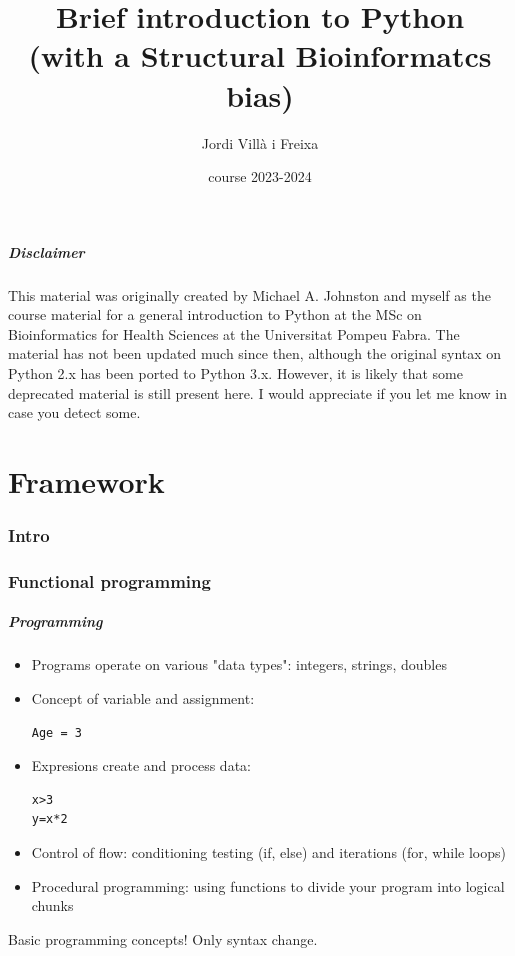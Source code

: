 \documentclass{beamer}
\title[Introduction]{Brief introduction to Python\\\small (with a Structural Bioinformatcs bias)} %
\author{Jordi Villà i Freixa} %
\institute[FCTE] %
{
Universitat de Vic - Universitat Central de Catalunya \\
Study Abroad\\ %
\medskip
\textit{jordi.villa@uvic.cat}\\ %
\copyright Michael A. Johnston 2007; JVF 2007-2023 
}
\date{course 2023-2024}
\begin{document}
\begin{frame}
  \titlepage %
\end{frame}

\begin{frame}
  \frametitle{Disclaimer}
  This material was originally created by Michael A. Johnston and myself as the course material for a general introduction to Python at the MSc on Bioinformatics for Health Sciences at the Universitat Pompeu Fabra. The material has not been updated much since then, although the original syntax on Python 2.x has been ported to Python 3.x. However, it is likely that some deprecated material is still present here. I would appreciate if you let me know in case you detect some. 
\end{frame}


\part{Framework}
\begin{frame}
\tableofcontents
\end{frame}

\section{Intro}
\section{Functional programming}

\begin{frame}[containsverbatim]
\frametitle{Programming}
\begin{itemize}
\item Programs operate on various "data types": integers, strings, doubles
\item Concept of variable and assignment: 
\begin{lstlisting}
Age = 3
\end{lstlisting}
\item Expresions create and process data:
\begin{lstlisting}
x>3
y=x*2
\end{lstlisting}
\item Control of flow: conditioning testing (if, else) and iterations (for, while loops)
\item Procedural programming: using functions to divide your program into logical chunks
\end{itemize}
Basic programming concepts! Only syntax change.
\end{frame}
\end{document}
